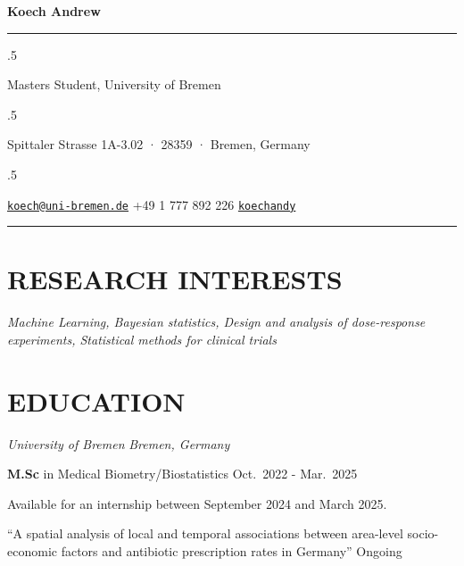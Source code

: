 \documentclass[13pt,]{article}
\providecommand{\tightlist}{%
  \setlength{\itemsep}{0pt}\setlength{\parskip}{0pt}}
\renewenvironment{itemize}{
  \begin{list}{}{
    \setlength{\leftmargin}{1.5em}
  }
}{
  \end{list}
}
\begin{document}
\centerline{\huge \bf Koech Andrew}

\vspace{2 mm}

\hrule

\vspace{2 mm}

\moveleft.5\hoffset\centerline{Masters Student, University of Bremen}
\moveleft.5\hoffset\centerline{Spittaler Strasse 1A-3.02 · 28359 ·
Bremen, Germany}
\moveleft.5\hoffset\centerline{ \faEnvelopeO \hspace{1 mm} \href{mailto:}{\tt \href{mailto:koech@uni-bremen.de}{\nolinkurl{koech@uni-bremen.de}}} \hspace{1 mm}  \faPhone \hspace{1 mm}  +49
1 777 892
226  \hspace{1 mm}  \faGithub \hspace{1 mm} \href{http://github.com/koechandy}{\tt koechandy} \hspace{1 mm}      } 

\vspace{2 mm}

\hrule


\hypertarget{research-interests}{%
\section{\texorpdfstring{\textbf{RESEARCH
INTERESTS}}{RESEARCH INTERESTS}}\label{research-interests}}

\begin{itemize}
\tightlist
\item
  \emph{Machine Learning, Bayesian statistics, Design and analysis of
  dose-response experiments, Statistical methods for clinical trials}
\end{itemize}

\hypertarget{education}{%
\section{\texorpdfstring{\textbf{EDUCATION}}{EDUCATION}}\label{education}}

\emph{University of Bremen} \hfill \emph{Bremen, Germany}

\begin{itemize}
\item
  \textbf{M.Sc} in Medical Biometry/Biostatistics \hfill Oct.~2022 -
  Mar.~2025

  \begin{itemize}
  \item
    Available for an internship between September 2024 and March 2025.
  \item
    ``A spatial analysis of local and temporal associations between
    area-level socio-economic factors and antibiotic prescription rates
    in Germany'' \hfill Ongoing
  \end{itemize}
\end{itemize}
\end{document}
